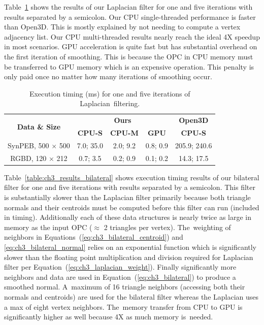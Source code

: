 Table~\ref{table:ch3_results_lapalcian} shows the results of our Laplacian filter for one and five iterations with results separated by a semicolon. Our CPU single-threaded performance is faster than Open3D. This is mostly explained by not needing to compute a vertex adjacency list. Our CPU multi-threaded results nearly reach the ideal 4X speedup in most scenarios. GPU acceleration is quite fast but has substantial overhead on the first iteration of smoothing. This is because the \ac{OPC} in CPU memory must be transferred to GPU memory which is an expensive operation. This penalty is only paid once no matter how many iterations of smoothing occur.  
\begin{table}[H]
\centering
\caption{Execution timing (ms) for one and five iterations of Laplacian~filtering.}\label{table:ch3_results_lapalcian}

\begin{tabular}{@{}ccccc@{}}
\toprule
   \multirow{2}{*}{\bf Data \& Size}           & \multicolumn{3}{c}{\textbf{Ours}} & \textbf{Open3D} \\
                  \cmidrule(lr){2-5}     
    & \textbf{CPU-S}     & \textbf{CPU-M}     & \textbf{GPU}         & \textbf{CPU-S}  \\ \midrule
SynPEB, 500 $\times$ 500 & 7.0; 35.0  & 2.0; 9.2   & 0.8; 0.9    & 205.9; 240.6  \\
RGBD, 120 $\times$ 212   & 0.7; 3.5  & 0.2; 0.9   & 0.1; 0.2    & 14.3; 17.5   \\ \bottomrule
\end{tabular}
\end{table}


Table~\ref{table:ch3_results_bilateral} shows execution timing results of our bilateral filter for one and five iterations with results separated by a semicolon. This filter is substantially slower than the Laplacian filter primarily because both triangle normals and their centroids must be computed before this filter can run (included in timing). Additionally each of these data structures is nearly twice as large in memory as the input \ac{OPC} ($\approx$ 2 triangles per vertex). The~weighting of neighbors in Equations~(\ref{eq:ch3_bilateral_centroid}) and \ref{eq:ch3_bilateral_normal} relies on an exponential function which is significantly slower than the floating point multiplication and division required for Laplacian filter per Equation~(\ref{eq:ch3_laplacian_weight}). Finally significantly more neighbors and data are used in Equation~(\ref{eq:ch3_bilateral}) to produce a smoothed normal. A~maximum of 16 triangle neighbors (accessing both their normals and centroids) are used for the bilateral filter whereas the Laplacian uses a max of eight vertex neighbors. The~memory transfer from CPU to GPU is significantly higher as well because 4X as much memory is~needed.

